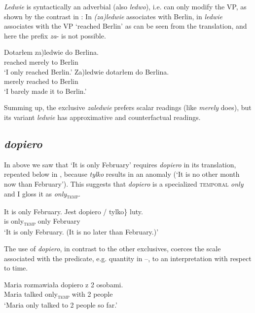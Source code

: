 \documentclass[output=paper,colorlinks,citecolor=brown]{langscibook}
\begin{document}
\noindent \textit{Ledwie} is syntactically an adverbial (also \textit{ledwo}), i.e. can only modify the VP, as shown by the contrast in : In  \textit{(za)ledwie} associates with Berlin, in  \textit{ledwie} associates with the VP ‘reached Berlin’ as can be seen from the translation, and here the prefix \textit{za}{}- is not possible.

\ea\label{ex:tom:43}
\ea\label{ex:tom:43a} 
\gll Dotarłem \minsp{(} za)ledwie do Berlina.\\
reached {} merely to  Berlin\\
\glt `I only reached Berlin.’
\ex\label{ex:tom:43b} 
\gll \minsp{(*} Za)ledwie dotarłem do Berlina.\\
 {} merely reached to Berlin\\
\glt `I barely made it to Berlin.’
\z 
\z 

\noindent Summing up, the exclusive \textit{zaledwie} prefers scalar readings (like \textit{merely} does), but its variant \textit{ledwie} has approximative and counterfactual readings.

\subsection{\textit{dopiero}}
\label{sec:tom:4.3}

In  above we saw that `It is only February' requires \textit{dopiero} in its translation, repeated below in , because \textit{tylko} results in an anomaly (`It is no other month now than February'). This suggests that \textit{dopiero} is a specialized \textsc{temporal} \textit{only} and I gloss it as \textit{only}\textsubscript{\textsc{temp}}.

\ea\label{ex:tom:44}
\ea\label{ex:tom:44a}   
It is only February.
\ex\label{ex:tom:44b}        
\gll Jest \minsp{\{} dopiero / \minsp{*} tylko\} luty.\\
is {} only\textsubscript{\textsc{temp}} {} {} only February\\
\glt `It is only February. (It is no later than February.)'
\z 
\z 

\noindent The use of \textit{dopiero}, in contrast to the other exclusives, coerces the scale associated with the predicate, e.g. quantity in --, to an interpretation with respect to time.

\ea\label{ex:tom:45}
\gll Maria rozmawiała dopiero z 2 osobami.\\
Maria talked only\textsubscript{\textsc{temp}} with 2 people\\
\glt `Maria only talked to 2 people so far.’
\z 
\end{document}

